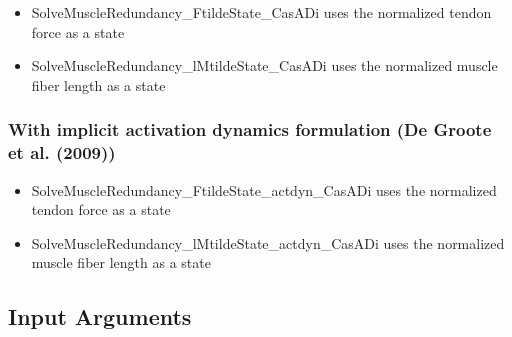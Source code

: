 \documentclass[a4paper,oneside,11pt]{article}
\begin{document}
\begin{itemize}
\item SolveMuscleRedundancy_FtildeState_CasADi uses the normalized tendon force as a state
\item SolveMuscleRedundancy_lMtildeState_CasADi uses the normalized muscle fiber length as a state
\end{itemize}

\subsubsection{With implicit activation dynamics formulation (De Groote et al. (2009))}

\begin{itemize}
\item SolveMuscleRedundancy_FtildeState_actdyn_CasADi uses the normalized tendon force as a state
\item SolveMuscleRedundancy_lMtildeState_actdyn_CasADi uses the normalized muscle fiber length as a state
\end{itemize}


\subsection{Input Arguments}
\end{document}
